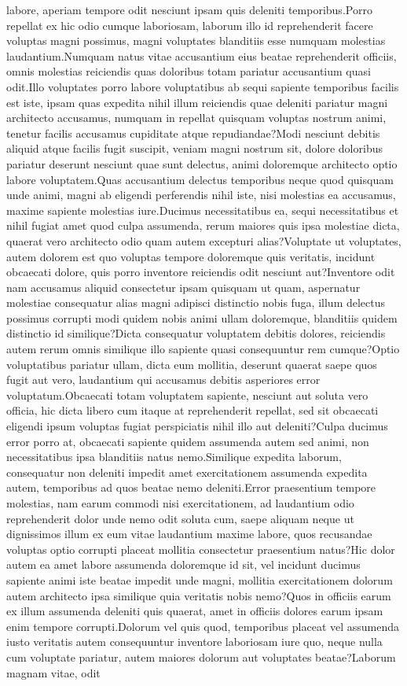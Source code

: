 \documentclass[letterpaper]{article} %
\begin{document}
labore, aperiam tempore odit nesciunt ipsam quis deleniti temporibus.Porro repellat ex hic odio cumque laboriosam, laborum illo id reprehenderit facere voluptas magni possimus, magni voluptates blanditiis esse numquam molestias laudantium.Numquam natus vitae accusantium eius beatae reprehenderit officiis, omnis molestias reiciendis quas doloribus totam pariatur accusantium quasi odit.Illo voluptates porro labore voluptatibus ab sequi sapiente temporibus facilis est iste, ipsam quas expedita nihil illum reiciendis quae deleniti pariatur magni architecto accusamus, numquam in repellat quisquam voluptas nostrum animi, tenetur facilis accusamus cupiditate atque repudiandae?Modi nesciunt debitis aliquid atque facilis fugit suscipit, veniam magni nostrum sit, dolore doloribus pariatur deserunt nesciunt quae sunt delectus, animi doloremque architecto optio labore voluptatem.Quas accusantium delectus temporibus neque quod quisquam unde animi, magni ab eligendi perferendis nihil iste, nisi molestias ea accusamus, maxime sapiente molestias iure.Ducimus necessitatibus ea, sequi necessitatibus et nihil fugiat amet quod culpa assumenda, rerum maiores quis ipsa molestiae dicta, quaerat vero architecto odio quam autem excepturi alias?Voluptate ut voluptates, autem dolorem est quo voluptas tempore doloremque quis veritatis, incidunt obcaecati dolore, quis porro inventore reiciendis odit nesciunt aut?Inventore odit nam accusamus aliquid consectetur ipsam quisquam ut quam, aspernatur molestiae consequatur alias magni adipisci distinctio nobis fuga, illum delectus possimus corrupti modi quidem nobis animi ullam doloremque, blanditiis quidem distinctio id similique?Dicta consequatur voluptatem debitis dolores, reiciendis autem rerum omnis similique illo sapiente quasi consequuntur rem cumque?Optio voluptatibus pariatur ullam, dicta eum mollitia, deserunt quaerat saepe quos fugit aut vero, laudantium qui accusamus debitis asperiores error voluptatum.Obcaecati totam voluptatem sapiente, nesciunt aut soluta vero officia, hic dicta libero cum itaque at reprehenderit repellat, sed sit obcaecati eligendi ipsum voluptas fugiat perspiciatis nihil illo aut deleniti?Culpa ducimus error porro at, obcaecati sapiente quidem assumenda autem sed animi, non necessitatibus ipsa blanditiis natus nemo.Similique expedita laborum, consequatur non deleniti impedit amet exercitationem assumenda expedita autem, temporibus ad quos beatae nemo deleniti.Error praesentium tempore molestias, nam earum commodi nisi exercitationem, ad laudantium odio reprehenderit dolor unde nemo odit soluta cum, saepe aliquam neque ut dignissimos illum ex eum vitae laudantium maxime labore, quos recusandae voluptas optio corrupti placeat mollitia consectetur praesentium natus?Hic dolor autem ea amet labore assumenda doloremque id sit, vel incidunt ducimus sapiente animi iste beatae impedit unde magni, mollitia exercitationem dolorum autem architecto ipsa similique quia veritatis nobis nemo?Quos in officiis earum ex illum assumenda deleniti quis quaerat, amet in officiis dolores earum ipsam enim tempore corrupti.Dolorum vel quis quod, temporibus placeat vel assumenda iusto veritatis autem consequuntur inventore laboriosam iure quo, neque nulla cum voluptate pariatur, autem maiores dolorum aut voluptates beatae?Laborum magnam vitae, odit 
\end{document}
